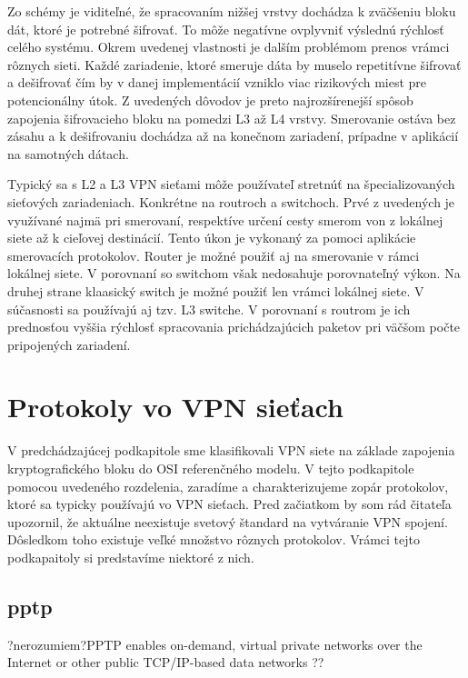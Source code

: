 Zo schémy je viditeľné, že spracovaním nižšej vrstvy dochádza k zväčšeniu bloku dát, ktoré je potrebné šifrovať. To môže negatívne ovplyvniť výslednú rýchlosť celého systému. Okrem uvedenej vlastnosti je dalším problémom prenos vrámci rôznych sieti. Každé zariadenie, ktoré smeruje dáta by muselo repetitívne šifrovať a dešifrovať čím by v danej implementácií vzniklo viac rizikových miest pre potencionálny útok. Z uvedených dôvodov je preto najrozšírenejší spôsob zapojenia šifrovacieho bloku na pomedzi L3 až L4 vrstvy. Smerovanie ostáva bez zásahu a k dešifrovaniu dochádza až na konečnom zariadení, prípadne v aplikácií na samotných dátach.

Typický sa s L2 a L3 VPN sieťami môže používateľ stretnúť na špecializovaných sieťových zariadeniach. Konkrétne na routroch a switchoch. Prvé z uvedených je využívané najmä pri smerovaní, respektíve určení cesty smerom von z lokálnej siete až k cieľovej destinácií. Tento úkon je vykonaný za pomoci aplikácie smerovacích protokolov. Router je možné použiť aj na smerovanie v rámci lokálnej siete. V porovnaní so switchom však nedosahuje porovnateľný výkon. Na druhej strane klaasický switch je možné použiť len vrámci lokálnej siete. V súčasnosti sa používajú aj tzv. L3 switche. V porovnaní s routrom je ich prednosťou vyššia rýchlosť spracovania prichádzajúcich paketov pri väčšom počte pripojených zariadení.        

\section{Protokoly vo VPN sieťach} 
V predchádzajúcej podkapitole sme klasifikovali VPN siete na základe zapojenia kryptografického bloku do OSI referenčného modelu. V tejto podkapitole pomocou uvedeného rozdelenia, zaradíme a charakterizujeme zopár protokolov, ktoré sa typicky používajú vo VPN sieťach. Pred začiatkom by som rád čitateľa upozornil, že aktuálne neexistuje svetový štandard na vytváranie VPN spojení. Dôsledkom toho existuje veľké množstvo rôznych protokolov. Vrámci tejto podkapaitoly si predstavíme niektoré z nich. 

\subsection{\acrfull{pptp}}

?nerozumiem?PPTP enables on-demand, virtual private networks over the Internet or other public TCP/IP-based data networks ??\\

